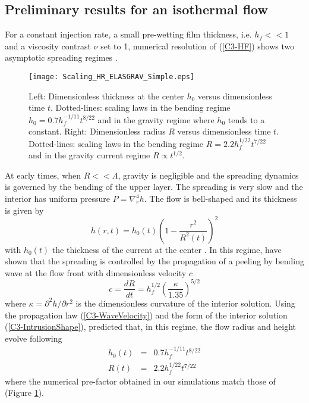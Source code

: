 \subsection{Preliminary results for an isothermal flow}
\label{C3-sec:prel-results-isoth}

For a  constant injection  rate, a  small pre-wetting  film thickness,
i.e.   $h_f<<1$ and  a viscosity  contrast $\nu$  set to  1, numerical
resolution  of (\ref{C3-HF})  shows two  asymptotic spreading  regimes
\citep{Michaut:2011kg,Lister:2013ia}.
\begin{figure}
  \begin{center}
    \graphicspath{ {/Users/thorey/Documents/These/Projet/Refroidissement/Skin_Model/Figure/JFM_V13/} }
    \texttt{[image: Scaling\_HR\_ELASGRAV\_Simple.eps]}
    \caption{Left: Dimensionless thickness at  the center $h_0$ versus
      dimensionless  time  $t$.   Dotted-lines: scaling  laws  in  the
      bending regime $h_0= 0.7h_f^{-1/11}t^{8/22}$  and in the gravity
      regime where  $h_0$ tends  to a constant.   Right: Dimensionless
      radius $R$ versus dimensionless time $t$.  Dotted-lines: scaling
      laws in the bending regime $R= 2.2h_f^{1/22}t^{7/22}$ and in the
      gravity current regime $R\propto t^{1/2}$.}
    \label{C3-Scaling_HR_ELASGRAV_Simple}
  \end{center}
\end{figure}

At  early times,  when  $R<<\Lambda$, gravity  is  negligible and  the
spreading dynamics is governed by the bending of the upper layer.  The
spreading  is  very  slow  and   the  interior  has  uniform  pressure
$P =\nabla_r^4h$.  The flow is  bell-shaped and its thickness is given
by
\begin{equation}
  h(r,t) = h_0(t)\left(1-\frac{r^2}{R^2(t)}\right)^2
  \label{C3-IntrusionShape}
\end{equation}
with   $h_0(t)$  the   thickness  of   the  current   at  the   center
\citep{Michaut:2011kg,Lister:2013ia}.       In       this      regime,
\citet{Lister:2013ia} have  shown that the spreading  is controlled by
the propagation  of a peeling by  bending wave at the  flow front with
dimensionless velocity $c$
\begin{equation}
  c=    \frac{d             R}{d            t}             =h_f^{1/2}
  \left(\frac{\kappa}{1.35}\right)^{5/2}
  \label{C3-WaveVelocity}
\end{equation}
where  $\kappa  =  \partial^2  h/\partial r^2$  is  the  dimensionless
curvature  of  the  interior  solution.   Using  the  propagation  law
(\ref{C3-WaveVelocity})  and   the  form  of  the   interior  solution
(\ref{C3-IntrusionShape}),  \citet{Lister:2013ia}  predicted that,  in
this regime, the flow radius and height evolve following
\begin{eqnarray}
  h_0(t)&=& 0.7 h_f^{-1/11}t^{8/22}\label{C3-ScalingH}\\
  R(t) &=& 2.2h_f^{1/22}t^{7/22}\label{C3-ScalingR}
\end{eqnarray}
where the numerical pre-factor obtained in our simulations match those
of \citet{Lister:2013ia} (Figure \ref{C3-Scaling_HR_ELASGRAV_Simple}).

